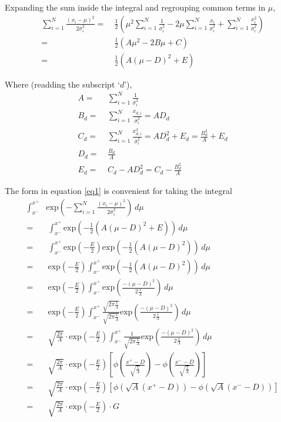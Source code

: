 \documentclass{article}
\newcommand{\sig}{\overline{\sigma}_i}
\newcommand{\eq}{=&\ }
\begin{document}
Expanding the sum inside the integral and regrouping common terms in $\mu$,
\begin{align}
  \sum_{i=1}^{N} \frac{(x_i-\mu)^2 }{ 2\sig^2 } 
    \eq \frac{1}{2}\left( \mu^{2}\sum_{i=1}^{N}\frac{1}{\sig^2} - 2\mu\sum_{i=1}^{N}\frac{x_i}{\sig^2} + \sum_{i=1}^{N}\frac{x_i^2}{\sig^2} \right) \\
    \eq \frac{1}{2}\left( A\mu^{2} - 2B\mu + C \right) \\
    \eq \frac{1}{2}\left( A(\mu - D)^2 + E \right) \label{eq1}                                                 
\end{align}

Where (readding the subscript `$d$'),
\begin{align}
  A \eq \sum_{i=1}^{N}\frac{1}{\sig^2} \\
  B_d \eq \sum_{i=1}^{N}\frac{x_{d,i}}{\sig^2} = AD_d \\
  C_d \eq \sum_{i=1}^{N}\frac{x_{d,i}^2}{\sig^2} = AD_d^2 + E_d = \frac{B_d^2}{A} + E_d \\     
  D_d \eq \frac{B_d}{A} \\
  E_d \eq C_d - AD_d^2 = C_d - \frac{B_d^2}{A}
\end{align}

The form in equation \ref{eq1} is convenient for taking the integral
\begin{align}
  \int_{x^-}^{x^+} & \text{exp}\left( -\sum_{i=1}^{N} \frac{(x_i-\mu)^2 }{ 2\sig^2 } \right)\,d\mu \nonumber \\
    \eq \int_{x^-}^{x^+} \text{exp}\left( -\frac{1}{2}\left( A(\mu - D)^2 + E \right) \right)\,d\mu \\
    \eq \int_{x^-}^{x^+} \text{exp}\left(-\frac{E}{2}\right) \text{exp}\left( -\frac{1}{2}\left( A(\mu - D)^2 \right) \right)\,d\mu \\
    \eq \text{exp}\left(-\frac{E}{2}\right) \int_{x^-}^{x^+} \text{exp}\left( -\frac{1}{2}\left( A(\mu - D)^2 \right) \right)\,d\mu \\
    \eq \text{exp}\left(-\frac{E}{2}\right) \int_{x^-}^{x^+} \text{exp}\left( \frac{-(\mu - D)^2}{2\frac{1}{A}}\right)\,d\mu \\
    \eq \text{exp}\left(-\frac{E}{2}\right) \int_{x^-}^{x^+} \frac{\sqrt{2\pi\frac{1}{A}}}{\sqrt{2\pi\frac{1}{A}}} \text{exp}\left( \frac{-(\mu - D)^2}{2\frac{1}{A}}\right)\,d\mu \\
    \eq \sqrt{\frac{2\pi}{A}}\cdot\text{exp}\left(-\frac{E}{2}\right) \int_{x^-}^{x^+} \frac{1}{\sqrt{2\pi\frac{1}{A}}} \text{exp}\left( \frac{-(\mu - D)^2}{2\frac{1}{A}}\right)\,d\mu \\
    \eq \sqrt{\frac{2\pi}{A}}\cdot\text{exp}\left(-\frac{E}{2}\right) \left[ \phi\left(\frac{x^+-D}{\sqrt{\frac{1}{A}}}\right) - \phi\left(\frac{x^--D}{\sqrt{\frac{1}{A}}}\right) \right] \\
    \eq \sqrt{\frac{2\pi}{A}}\cdot\text{exp}\left(-\frac{E}{2}\right) \left[ \phi\left(\sqrt{A}(x^+-D)\right) - \phi\left(\sqrt{A}(x^--D)\right) \right] \\
    \eq \sqrt{\frac{2\pi}{A}}\cdot\text{exp}\left(-\frac{E}{2}\right) \cdot G
\end{align}
\end{document}
